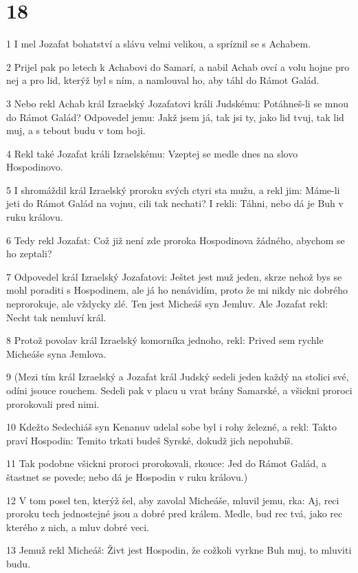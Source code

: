 \chapter{18}

\par 1 I mel Jozafat bohatství a slávu velmi velikou, a spríznil se s Achabem.
\par 2 Prijel pak po letech k Achabovi do Samarí, a nabil Achab ovcí a volu hojne pro nej a pro lid, kterýž byl s ním, a namlouval ho, aby táhl do Rámot Galád.
\par 3 Nebo rekl Achab král Izraelský Jozafatovi králi Judskému: Potáhneš-li se mnou do Rámot Galád? Odpovedel jemu: Jakž jsem já, tak jsi ty, jako lid tvuj, tak lid muj, a s tebout budu v tom boji.
\par 4 Rekl také Jozafat králi Izraelskému: Vzeptej se medle dnes na slovo Hospodinovo.
\par 5 I shromáždil král Izraelský proroku svých ctyri sta mužu, a rekl jim: Máme-li jeti do Rámot Galád na vojnu, cili tak nechati? I rekli: Táhni, nebo dá je Buh v ruku královu.
\par 6 Tedy rekl Jozafat: Což již není zde proroka Hospodinova žádného, abychom se ho zeptali?
\par 7 Odpovedel král Izraelský Jozafatovi: Ještet jest muž jeden, skrze nehož bys se mohl poraditi s Hospodinem, ale já ho nenávidím, proto že mi nikdy nic dobrého neprorokuje, ale vždycky zlé. Ten jest Micheáš syn Jemluv. Ale Jozafat rekl: Necht tak nemluví král.
\par 8 Protož povolav král Izraelský komorníka jednoho, rekl: Prived sem rychle Micheáše syna Jemlova.
\par 9 (Mezi tím král Izraelský a Jozafat král Judský sedeli jeden každý na stolici své, odíni jsouce rouchem. Sedeli pak v placu u vrat brány Samarské, a všickni proroci prorokovali pred nimi.
\par 10 Kdežto Sedechiáš syn Kenanuv udelal sobe byl i rohy železné, a rekl: Takto praví Hospodin: Temito trkati budeš Syrské, dokudž jich nepohubíš.
\par 11 Tak podobne všickni proroci prorokovali, rkouce: Jed do Rámot Galád, a štastnet se povede; nebo dá je Hospodin v ruku královu.)
\par 12 V tom posel ten, kterýž šel, aby zavolal Micheáše, mluvil jemu, rka: Aj, reci proroku tech jednostejné jsou a dobré pred králem. Medle, bud rec tvá, jako rec kterého z nich, a mluv dobré veci.
\par 13 Jemuž rekl Micheáš: Živt jest Hospodin, že cožkoli vyrkne Buh muj, to mluviti budu.
